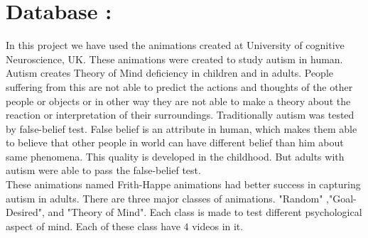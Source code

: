 \documentclass[11pt, twocolumn]{article}
\begin{document}
\section*{Database :}
In this project we have used the animations\cite{fhanimation} created at University of cognitive Neuroscience, UK. These animations were created to study autism in human. Autism creates Theory of Mind deficiency in children and in adults. People suffering from this are not able to predict the actions and thoughts of the other people or objects or in other way they are not able to make a theory about the reaction or interpretation of their surroundings. Traditionally autism was tested by false-belief test. False belief is an attribute in human, which makes them able to believe that other people in world can have different belief than him about same phenomena. This quality is developed in the childhood. But adults with autism were able to pass the false-belief test.\\
\hspace*{10pt} These animations named Frith-Happe animations had better success in capturing autism in adults. There are three major classes of animations. "Random" ,"Goal-Desired", and "Theory of Mind". Each class is made to test different psychological aspect of mind. Each of these class have $4$ videos in it.\\
\end{document}
